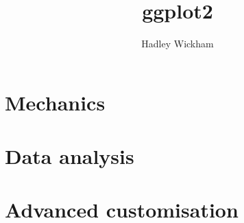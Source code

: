 
\renewcommand{\setflag}{\newif \ifwhole 
\wholetrue}

\title{ggplot2} 
\author{Hadley Wickham} 
\maketitle 

\tableofcontents




\part{Mechanics}





\part{Data analysis}




\part{Advanced customisation}



\appendix
\appendixpage





